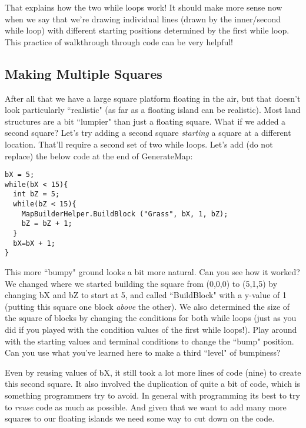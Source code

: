 \documentclass{article}
\begin{document}
That explains how the two while loops work! It should make more sense now when we say that we're drawing individual lines (drawn by the inner/second while loop) with different starting positions determined by the first while loop. This practice of walkthrough through code can be very helpful!

\subsection{Making Multiple Squares}

After all that we have a large square platform floating in the air, but that doesn't look particularly ``realistic" (as far as a floating island can be realistic). Most land structures are a bit ``lumpier" than just a floating square. What if we added a second square? Let's try adding a second square \textit{starting} a square at a different location. That'll require a second set of two while loops. Let's add (do not replace) the below code at the end of GenerateMap:

\lstset{style=sharpc}
\begin{lstlisting}
bX = 5;
while(bX < 15){
  int bZ = 5;
  while(bZ < 15){
    MapBuilderHelper.BuildBlock ("Grass", bX, 1, bZ);
    bZ = bZ + 1;
  }
  bX=bX + 1;
}
\end{lstlisting} 

\noindent{}

This more ``bumpy" ground looks a bit more natural. Can you see how it worked? We changed where we started building the square from (0,0,0) to (5,1,5) by changing bX and bZ to start at 5, and called ``BuildBlock" with a y-value of 1 (putting this square one block \textit{above} the other). We also determined the size of the square of blocks by changing the conditions for both while loops (just as you did if you played with the condition values of the first while loops!). Play around with the starting values and terminal conditions to change the ``bump" position. Can you use what you've learned here to make a third ``level" of bumpiness? 

Even by reusing values of bX, it still took a lot more lines of code (nine) to create this second square. It also involved the duplication of quite a bit of code, which is something programmers try to avoid. In general with programming its best to try to \textit{reuse} code as much as possible. And given that we want to add many more squares to our floating islands we need some way to cut down on the code.
\end{document}
